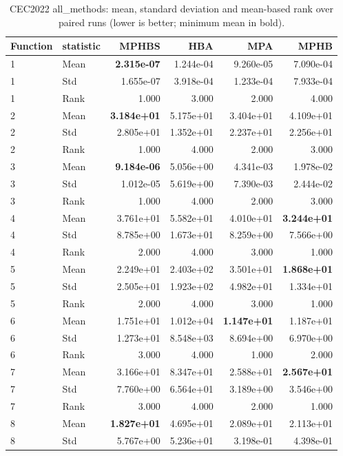 \begin{table}[t]
\centering
\scriptsize
\caption{CEC2022 all_methods: mean, standard deviation and mean-based rank over paired runs (lower is better; minimum mean in bold).}
\label{tab:cec2022_all_methods}
\begin{tabular}{llrrrr}
\hline
Function & statistic & MPHBS & HBA & MPA & MPHB \\
\hline
1 & Mean & \textbf{2.315e-07} & 1.244e-04 & 9.260e-05 & 7.090e-04 \\
1 & Std & 1.655e-07 & 3.918e-04 & 1.233e-04 & 7.933e-04 \\
1 & Rank & 1.000 & 3.000 & 2.000 & 4.000 \\
2 & Mean & \textbf{3.184e+01} & 5.175e+01 & 3.404e+01 & 4.109e+01 \\
2 & Std & 2.805e+01 & 1.352e+01 & 2.237e+01 & 2.256e+01 \\
2 & Rank & 1.000 & 4.000 & 2.000 & 3.000 \\
3 & Mean & \textbf{9.184e-06} & 5.056e+00 & 4.341e-03 & 1.978e-02 \\
3 & Std & 1.012e-05 & 5.619e+00 & 7.390e-03 & 2.444e-02 \\
3 & Rank & 1.000 & 4.000 & 2.000 & 3.000 \\
4 & Mean & 3.761e+01 & 5.582e+01 & 4.010e+01 & \textbf{3.244e+01} \\
4 & Std & 8.785e+00 & 1.673e+01 & 8.259e+00 & 7.566e+00 \\
4 & Rank & 2.000 & 4.000 & 3.000 & 1.000 \\
5 & Mean & 2.249e+01 & 2.403e+02 & 3.501e+01 & \textbf{1.868e+01} \\
5 & Std & 2.505e+01 & 1.923e+02 & 4.982e+01 & 1.334e+01 \\
5 & Rank & 2.000 & 4.000 & 3.000 & 1.000 \\
6 & Mean & 1.751e+01 & 1.012e+04 & \textbf{1.147e+01} & 1.187e+01 \\
6 & Std & 1.273e+01 & 8.548e+03 & 8.694e+00 & 6.970e+00 \\
6 & Rank & 3.000 & 4.000 & 1.000 & 2.000 \\
7 & Mean & 3.166e+01 & 8.347e+01 & 2.588e+01 & \textbf{2.567e+01} \\
7 & Std & 7.760e+00 & 6.564e+01 & 3.189e+00 & 3.546e+00 \\
7 & Rank & 3.000 & 4.000 & 2.000 & 1.000 \\
8 & Mean & \textbf{1.827e+01} & 4.695e+01 & 2.089e+01 & 2.113e+01 \\
8 & Std & 5.767e+00 & 5.236e+01 & 3.198e-01 & 4.398e-01 \\

\end{tabular}
\end{table}
